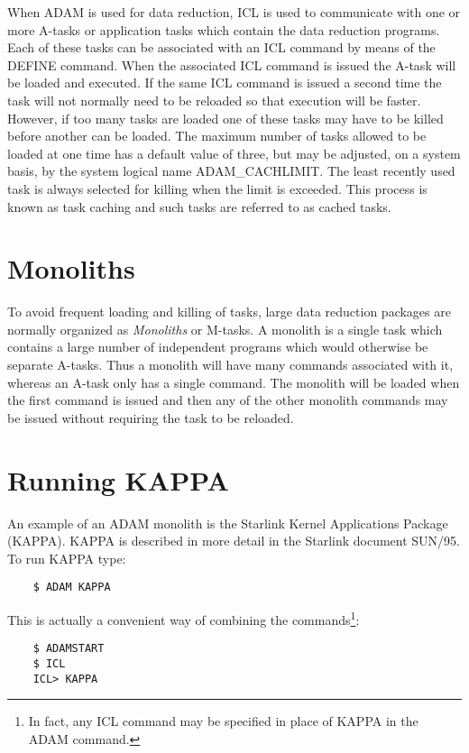 \documentclass[twoside,11pt]{report}
\newcommand{\xlabel}[1]{}
\begin{document}
When ADAM is used for data reduction, ICL is used to communicate with one
or more A-tasks or application tasks which contain the data reduction programs.
Each of these tasks can be associated with an ICL command by means of the
DEFINE command. When the associated ICL command is issued the A-task will
be loaded and executed. If the same ICL command is issued a second time
the task will not normally need to be reloaded so that execution will be
faster. However, if too many tasks are loaded one of these tasks may have
to be killed before another can be loaded. The maximum number of tasks
allowed to be loaded at one time has a default value of three, but may
be adjusted, on a system basis, by the system logical name ADAM\_CACHLIMIT. 
The least recently used task is always selected
for killing when the limit is exceeded. This process is known as task caching
and such tasks are referred to as cached tasks.
                 
\section{\xlabel{monoliths}Monoliths}

To avoid frequent loading and killing of tasks, large data reduction packages
are normally organized as {\em Monoliths} or M-tasks. A monolith is a single
task which contains a large number of independent programs which would
otherwise be separate A-tasks. Thus a monolith will have many commands
associated with it, whereas an A-task only has a single command. The
monolith will be loaded when the first command is issued and then any
of the other monolith commands may be issued without requiring the task
to be reloaded.

\section{\xlabel{running_kappa}Running KAPPA}

An example of an ADAM monolith is the Starlink Kernel Applications Package
(KAPPA). KAPPA is described in more detail in the Starlink document SUN/95.
To run KAPPA type:

\begin{verbatim}
    $ ADAM KAPPA
\end{verbatim}

This is actually a convenient way of combining the commands\footnote{
In fact, any ICL command may be specified in place of KAPPA in the ADAM
command.}:

\begin{verbatim}
    $ ADAMSTART
    $ ICL
    ICL> KAPPA
\end{verbatim}
\end{document}
